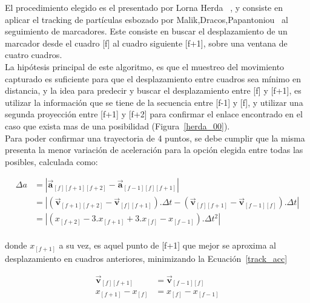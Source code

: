 El procedimiento elegido es el presentado por Lorna Herda~\cite{herda} , y consiste en aplicar el tracking de partículas esbozado por Malik,Dracos,Papantoniou~\cite{griegos} al seguimiento de marcadores. Este consiste en buscar el desplazamiento de un marcador desde el cuadro [f] al cuadro siguiente [f+1], sobre una ventana de cuatro cuadros.
\\ 

La hipótesis principal de este algoritmo, es que el muestreo del movimiento capturado es suficiente para que el desplazamiento entre cuadros sea mínimo en distancia, y la idea para predecir y buscar el desplazamiento entre [f] y [f+1], es utilizar la información que se tiene de la secuencia entre [f-1] y [f], y utilizar una segunda proyección entre [f+1] y [f+2] para confirmar el enlace encontrado en el caso que exista mas de una posibilidad (Figura~\ref{herda_00}).
\\ 

Para poder confirmar una trayectoria de 4 puntos, se debe cumplir que la misma presenta la menor variación de aceleración para la opción elegida entre todas las posibles, calculada como:

\begin{equation}
\begin{split}
\Delta{a}&= \left| \boldsymbol{\overrightarrow{a}}_{[f][f+1][f+2]}-\boldsymbol{\overrightarrow{a}}_{[f-1][f][f+1]} \right| \\
&= \left| \left(\boldsymbol{\overrightarrow{v}}_{[f+1][f+2]}-\boldsymbol{\overrightarrow{v}}_{[f][f+1]}\right).\Delta{t}-\left(\boldsymbol{\overrightarrow{v}}_{[f][f+1]}-\boldsymbol{\overrightarrow{v}}_{[f-1][f]}\right).\Delta{t} \right| \\
&= \left|\left( x_{[f+2]} - 3.x_{[f+1]} + 3.x_{[f]} - x_{[f-1]} \right).\Delta{t}^2\right|\\
\end{split}
\label{track_var_acc}
\end{equation}

donde $x_{[f+1]}$ a su vez, es aquel punto de [f+1] que mejor se aproxima al desplazamiento en cuadros anteriores, minimizando la Ecuación~\ref{track_acc} 

\begin{equation}
\begin{split}
\boldsymbol{\overrightarrow{v}}_{[f][f+1]}& = \boldsymbol{\overrightarrow{v}}_{[f-1][f]} \\
x_{[f+1]}-x_{[f]}& = x_{[f]}-x_{[f-1]} \\
\end{split}
\label{track_acc}
\end{equation}

